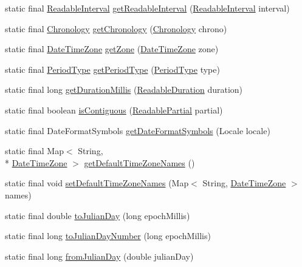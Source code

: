 \begin{DoxyCompactItemize}
\item 
static final \hyperlink{interfaceorg_1_1joda_1_1time_1_1_readable_interval}{Readable\-Interval} \hyperlink{classorg_1_1joda_1_1time_1_1_date_time_utils_a202197b3a9b141d44d98b5f4ac4e490c}{get\-Readable\-Interval} (\hyperlink{interfaceorg_1_1joda_1_1time_1_1_readable_interval}{Readable\-Interval} interval)
\item 
static final \hyperlink{classorg_1_1joda_1_1time_1_1_chronology}{Chronology} \hyperlink{classorg_1_1joda_1_1time_1_1_date_time_utils_af0bbe612cf904df05ac9d3835d3d0dc6}{get\-Chronology} (\hyperlink{classorg_1_1joda_1_1time_1_1_chronology}{Chronology} chrono)
\item 
static final \hyperlink{classorg_1_1joda_1_1time_1_1_date_time_zone}{Date\-Time\-Zone} \hyperlink{classorg_1_1joda_1_1time_1_1_date_time_utils_af40cdfc7d6bf41a48b8cd9bd2a37352e}{get\-Zone} (\hyperlink{classorg_1_1joda_1_1time_1_1_date_time_zone}{Date\-Time\-Zone} zone)
\item 
static final \hyperlink{classorg_1_1joda_1_1time_1_1_period_type}{Period\-Type} \hyperlink{classorg_1_1joda_1_1time_1_1_date_time_utils_a8914cf4df9aff44fd6ee1c926808aef9}{get\-Period\-Type} (\hyperlink{classorg_1_1joda_1_1time_1_1_period_type}{Period\-Type} type)
\item 
static final long \hyperlink{classorg_1_1joda_1_1time_1_1_date_time_utils_af1a53e64b8a0c38c7f2f499ed7cc32a5}{get\-Duration\-Millis} (\hyperlink{interfaceorg_1_1joda_1_1time_1_1_readable_duration}{Readable\-Duration} duration)
\item 
static final boolean \hyperlink{classorg_1_1joda_1_1time_1_1_date_time_utils_ab0b9c6c44f2dd462d5b5555177dbf481}{is\-Contiguous} (\hyperlink{interfaceorg_1_1joda_1_1time_1_1_readable_partial}{Readable\-Partial} partial)
\item 
static final Date\-Format\-Symbols \hyperlink{classorg_1_1joda_1_1time_1_1_date_time_utils_a86305d77af04540a319c313b2034036d}{get\-Date\-Format\-Symbols} (Locale locale)
\item 
static final Map$<$ String, \\*
\hyperlink{classorg_1_1joda_1_1time_1_1_date_time_zone}{Date\-Time\-Zone} $>$ \hyperlink{classorg_1_1joda_1_1time_1_1_date_time_utils_a1cdc2f8c021593590d224b6401d2b79d}{get\-Default\-Time\-Zone\-Names} ()
\item 
static final void \hyperlink{classorg_1_1joda_1_1time_1_1_date_time_utils_aeb3f1deb0016d88d63a9beb0cde893fd}{set\-Default\-Time\-Zone\-Names} (Map$<$ String, \hyperlink{classorg_1_1joda_1_1time_1_1_date_time_zone}{Date\-Time\-Zone} $>$ names)
\item 
static final double \hyperlink{classorg_1_1joda_1_1time_1_1_date_time_utils_ad55cfa724a13432ddef992bc7c4e6633}{to\-Julian\-Day} (long epoch\-Millis)
\item 
static final long \hyperlink{classorg_1_1joda_1_1time_1_1_date_time_utils_a915eda0316c059708df340b6512ccb98}{to\-Julian\-Day\-Number} (long epoch\-Millis)
\item 
static final long \hyperlink{classorg_1_1joda_1_1time_1_1_date_time_utils_a5ec70a4ada343a38ac88fcb8342c2ea9}{from\-Julian\-Day} (double julian\-Day)
\end{DoxyCompactItemize}
